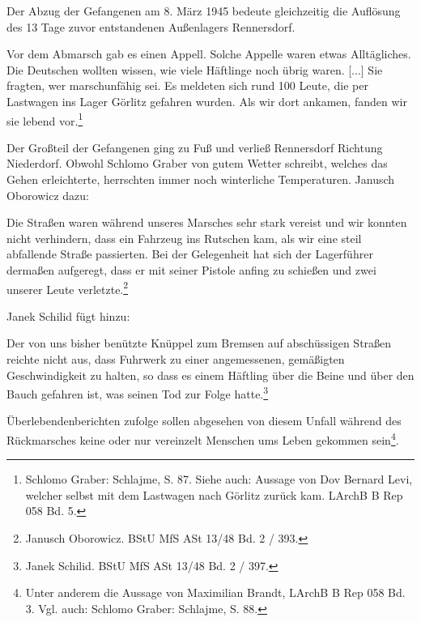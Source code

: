 \documentclass[a4paper,12pt,ngerman,
]{nisebook}
\begin{document}
Der Abzug der Gefangenen am 8. März 1945 bedeute gleichzeitig die Auflösung des 13 Tage zuvor entstandenen Außenlagers Rennersdorf. 

\begin{leftbar} 
Vor dem Abmarsch gab es einen Appell. Solche Appelle waren etwas Alltägliches. Die Deutschen wollten wissen, wie viele Häftlinge noch übrig waren. [...] Sie fragten, wer marschunfähig sei. Es meldeten sich rund 100 Leute, die per Lastwagen ins Lager Görlitz gefahren wurden. Als wir dort ankamen, fanden wir sie lebend vor.\footnote{Schlomo Graber: Schlajme, S. 87. Siehe auch: Aussage von Dov Bernard Levi, welcher selbst mit dem Lastwagen nach Görlitz zurück kam. LArchB B Rep 058 Bd. 5.}
\end{leftbar}

Der Großteil der Gefangenen ging zu Fuß und verließ Rennersdorf Richtung Niederdorf. Obwohl Schlomo Graber von gutem Wetter schreibt, welches das \glqq Gehen erleichterte\grqq, herrschten immer noch winterliche Temperaturen. Janusch Oborowicz dazu:
\begin{leftbar} 
Die Straßen waren während unseres Marsches sehr stark vereist und wir konnten nicht verhindern, dass ein Fahrzeug ins Rutschen kam, als wir eine steil abfallende Straße passierten. Bei der Gelegenheit hat sich der Lagerführer dermaßen aufgeregt, dass er mit seiner Pistole anfing zu schießen und zwei unserer Leute verletzte.\footnote{Janusch Oborowicz. BStU MfS ASt 13/48 Bd. 2 / 393.}
\end{leftbar}
Janek Schilid fügt hinzu:
\begin{leftbar} 
Der von uns bisher benützte Knüppel zum Bremsen auf abschüssigen Straßen reichte nicht aus, dass Fuhrwerk zu einer angemessenen, gemäßigten Geschwindigkeit zu halten, so dass es einem Häftling über die Beine und über den Bauch gefahren ist, was seinen Tod zur Folge hatte.\footnote{Janek Schilid. BStU MfS ASt 13/48 Bd. 2 / 397.}
\end{leftbar}
Überlebendenberichten zufolge sollen abgesehen von diesem Unfall während des Rückmarsches keine oder nur vereinzelt Menschen ums Leben gekommen sein\footnote{Unter anderem die Aussage von Maximilian Brandt, LArchB B Rep 058 Bd. 3. Vgl. auch: Schlomo Graber: Schlajme, S. 88.}.
\end{document}
